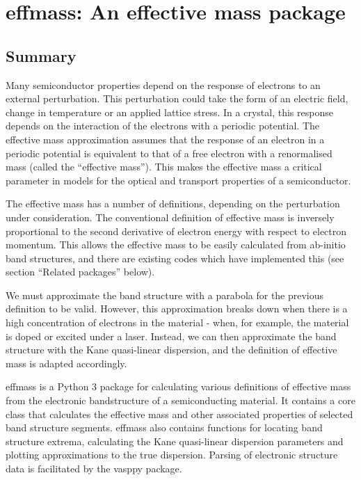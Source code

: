 \chapter{\label{app:1-effmass}effmass: An effective mass package}

\section{Summary}
\label{sec:summary}

Many semiconductor properties depend on the response of electrons to an external perturbation. This perturbation could take the form of an electric field, change in temperature or an applied lattice stress. In a crystal, this response depends on the interaction of the electrons with a periodic potential. The effective mass approximation assumes that the response of an electron in a periodic potential is equivalent to that of a free electron with a renormalised mass (called the ``effective mass''). This makes the effective mass a critical parameter in models for the optical and transport properties of a semiconductor.

The effective mass has a number of definitions, depending on the perturbation under consideration. The conventional definition of effective mass is inversely proportional to the second derivative of electron energy with respect to electron momentum.\autocite[p.~227]{Ashcroft1976} This allows the effective mass to be easily calculated from ab-initio band structures, and there are existing codes which have implemented this (see section ``Related packages'' below).

We must approximate the band structure with a parabola for the previous definition to be valid.\autocite{Ariel2012} However, this approximation breaks down when there is a high concentration of electrons in the material - when, for example, the material is doped or excited under a laser. Instead, we can then approximate the band structure with the Kane quasi-linear dispersion,\autocite{Kane1957} and the definition of effective mass is adapted accordingly.

effmass\autocite{Whalley2018b} is a Python 3 package for calculating various definitions of effective mass from the electronic bandstructure of a semiconducting material. It contains a core class that calculates the effective mass and other associated properties of selected band structure segments. effmass also contains functions for locating band structure extrema, calculating the Kane quasi-linear dispersion parameters and plotting approximations to the true dispersion. Parsing of electronic structure data is facilitated by the vasppy package.\autocite{Morgan2018}

